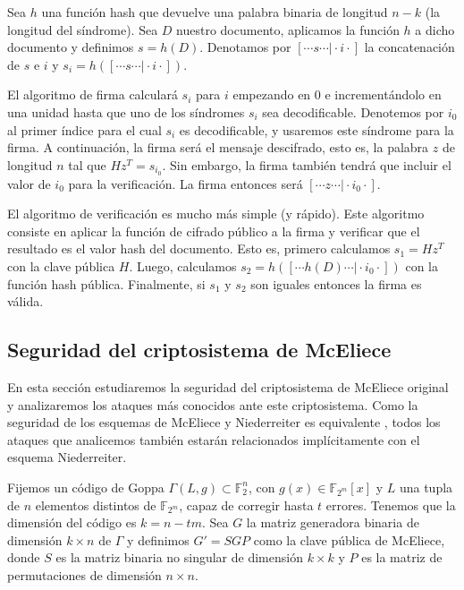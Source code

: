 Sea $h$ una función hash que devuelve una palabra binaria de longitud $n - k$ (la longitud del síndrome). Sea $D$ nuestro documento, aplicamos la función $h$ a dicho documento y definimos $s = h(D)$. Denotamos por $[ \cdots s \cdots \vert \cdot i \cdot]$ la concatenación de $s$ e $i$ y $s_i = h([ \cdots s \cdots \vert \cdot i \cdot])$.

El algoritmo de firma calculará $s_i$ para $i$ empezando en $0$ e incrementándolo en una unidad hasta que uno de los síndromes $s_i$ sea decodificable. Denotemos por $i_0$ al primer índice para el cual $s_i$ es decodificable, y usaremos este síndrome para la firma. A continuación, la firma será el mensaje descifrado, esto es, la palabra $z$ de longitud $n$ tal que $Hz^T = s_{i_0}$. Sin embargo, la firma también tendrá que incluir el valor de $i_0$ para la verificación. La firma entonces será $[\cdots z \cdots \vert \cdot i_0 \cdot]$.

El algoritmo de verificación es mucho más simple (y rápido). Este algoritmo consiste en aplicar la función de cifrado público a la firma y verificar que el resultado es el valor hash del documento. Esto es, primero calculamos $s_1 = Hz^T$ con la clave pública $H$. Luego, calculamos $s_2 = h([\cdots h(D) \cdots \vert \cdot i_0 \cdot])$ con la función hash pública. Finalmente, si $s_1$ y $s_2$ son iguales entonces la firma es válida.

\subsection{Seguridad del criptosistema de McEliece}

En esta sección estudiaremos la seguridad del criptosistema de McEliece original y analizaremos los ataques más conocidos ante este criptosistema. Como la seguridad de los esquemas de McEliece y Niederreiter es equivalente \cite{Equivalence_McEliece_Niederreiter}, todos los ataques que analicemos también estarán relacionados implícitamente con el esquema Niederreiter.

Fijemos un código de Goppa $\Gamma(L, g) \subset \mathbb{F}_2^n$, con $g(x) \in \mathbb{F}_{2^m}[x]$ y $L$ una tupla de $n$ elementos distintos de $\mathbb{F}_{2^m}$, capaz de corregir hasta $t$ errores. Tenemos que la dimensión del código es $k = n - tm$. Sea $G$ la matriz generadora binaria de dimensión $k \times n$ de $\Gamma$ y definimos $G' = SGP$ como la clave pública de McEliece, donde $S$ es la matriz binaria no singular de dimensión $k \times k$ y $P$ es la matriz de permutaciones de dimensión $n \times n$.

